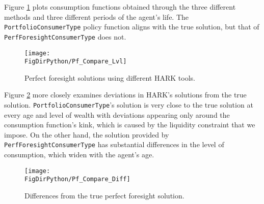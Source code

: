 \documentclass[../CGMPortfolio.tex]{subfiles}
\begin{document}
Figure \ref{fig:pf_compare_lvl} plots consumption functions obtained through the three different methods and three different periods of the agent's life. The \texttt{PortfolioConsumerType} policy function aligns with the true solution, but that of \texttt{PerfForesightConsumerType} does not.

\begin{figure}[h]
	\texttt{[image: \\FigDirPython/Pf\_Compare\_Lvl]}
	\caption{Perfect foresight solutions using different HARK tools.}
	\label{fig:pf_compare_lvl}
\end{figure}

Figure \ref{fig:pf_compare_diff} more closely examines deviations in HARK's
solutions from the true solution. \texttt{PortfolioConsumerType}'s solution
is very close to the true solution at every age and level of wealth with
deviations appearing only around the consumption function's kink, which is
caused by the liquidity constraint that we impose. On the other hand,
the solution provided by \texttt{PerfForesightConsumerType} has substantial
differences in the level of consumption, which widen with the agent's age.

\begin{figure}[h]
	\texttt{[image: \\FigDirPython/Pf\_Compare\_Diff]}
	\caption{Differences from the true perfect foresight solution.}
	\label{fig:pf_compare_diff}
\end{figure}
\end{document}
